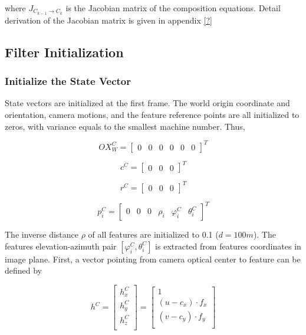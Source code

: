 \noindent where $J_{C_{k-1} \to C_k}$ is the Jacobian matrix of the
composition equations. Detail derivation of the Jacobian matrix is
given in appendix \ref{?}  

\subsection{Filter Initialization}
\subsubsection{Initialize the State Vector}

State vectors are initialized at the first frame. The world origin 
coordinate and orientation, camera motions, and the feature reference 
points are all initialized to zeros, with variance equals to the 
smallest machine number. Thus, 

\begin{equation}
\label{eq:OX_init}
OX_{W}^{C}=\begin{bmatrix}0&0&0&0&0&0\end{bmatrix}^T 
\end{equation}

\begin{equation}
c^{C}=\begin{bmatrix}0&0&0\end{bmatrix}^T
\end{equation}

\begin{equation}
r^{C}=\begin{bmatrix}0&0&0\end{bmatrix}^T
\end{equation}

\begin{equation}
p_{i}^{C}=\begin{bmatrix}0&0&0&\rho _{i}&\varphi_{i}^C&\theta_{i}^C\end{bmatrix}^T
\end{equation}

The inverse distance $\rho$ of all features are initialized to 0.1
($d=100m$). The features elevation-azimuth pair $[\varphi _{i}^{C},
\theta _{i}^{C}]$ is extracted from features coordinates in image
plane. First, a vector pointing from camera optical center to feature
can be defined by

\begin{equation}
\label{eq:init_feature_unit_vec}
h^{C}=\begin{bmatrix}
h_{x}^{C}\\
h_{y}^{C}\\
h_{z}^{C}\\
\end{bmatrix}
 = \begin{bmatrix}
1 \\
(u-c_x) \cdot f_{x} \\
(v-c_y) \cdot f_{y} \\
\end{bmatrix}
\end{equation}

